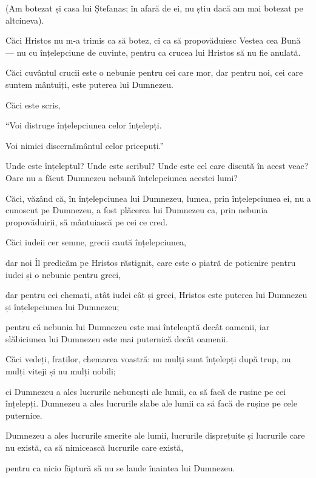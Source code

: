 {(Am botezat și casa lui Ștefanas; în afară de ei, nu știu dacă am mai botezat pe altcineva).

Căci Hristos nu m-a trimis ca să botez, ci ca să propovăduiesc Vestea cea Bună — nu cu înțelepciune de cuvinte, pentru ca crucea lui Hristos să nu fie anulată.

Căci cuvântul crucii este o nebunie pentru cei care mor, dar pentru noi, cei care suntem mântuiți, este puterea lui Dumnezeu.

Căci este scris,

\par }{\Q “Voi distruge înțelepciunea celor înțelepți.

\par }{\QB Voi nimici discernământul celor pricepuți.”


\par }{\PP {}Unde este înțeleptul? Unde este scribul? Unde este cel care discută în acest veac? Oare nu a făcut Dumnezeu nebună înțelepciunea acestei lumi?

Căci, văzând că, în înțelepciunea lui Dumnezeu, lumea, prin înțelepciunea ei, nu a cunoscut pe Dumnezeu, a fost plăcerea lui Dumnezeu ca, prin nebunia propovăduirii, să mântuiască pe cei ce cred.

Căci iudeii cer semne, grecii caută înțelepciunea,

dar noi Îl predicăm pe Hristos răstignit, care este o piatră de poticnire pentru iudei și o nebunie pentru greci,

dar pentru cei chemați, atât iudei cât și greci, Hristos este puterea lui Dumnezeu și înțelepciunea lui Dumnezeu;

pentru că nebunia lui Dumnezeu este mai înțeleaptă decât oamenii, iar slăbiciunea lui Dumnezeu este mai puternică decât oamenii.


\par }{\PP {}Căci vedeți, fraților, chemarea voastră: nu mulți sunt înțelepți după trup, nu mulți viteji și nu mulți nobili;

ci Dumnezeu a ales lucrurile nebunești ale lumii, ca să facă de rușine pe cei înțelepți. Dumnezeu a ales lucrurile slabe ale lumii ca să facă de rușine pe cele puternice.

Dumnezeu a ales lucrurile smerite ale lumii, lucrurile disprețuite și lucrurile care nu există, ca să nimicească lucrurile care există,

pentru ca nicio făptură să nu se laude înaintea lui Dumnezeu.

}
